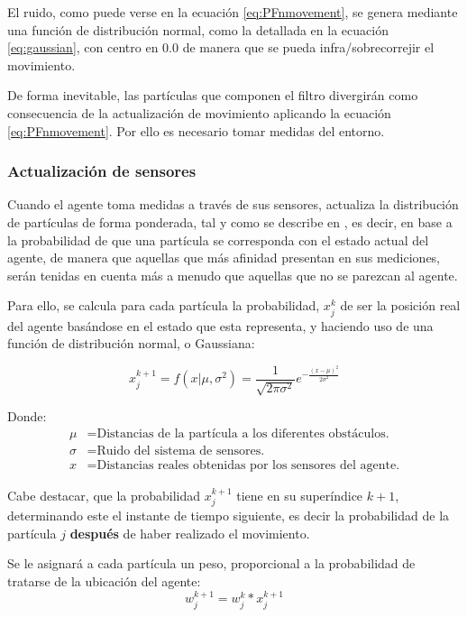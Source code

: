 \noindent El ruido, como puede verse en la ecuación \ref{eq:PFnmovement}, se genera mediante una función de distribución normal, como la detallada en la ecuación \ref{eq:gaussian}, con centro en $0.0$ de manera que se pueda infra/sobrecorrejir el movimiento.


De forma inevitable, las partículas que componen el filtro divergirán como consecuencia de la actualización de movimiento aplicando la ecuación \ref{eq:PFnmovement}. Por ello es necesario tomar medidas del entorno.

\subsubsection{Actualización de sensores}
Cuando el agente toma medidas a través de sus sensores, actualiza la distribución de partículas de forma ponderada, tal y como se describe en \citep{art:PFTuto, art:PFBL}, es decir, en base a la probabilidad de que una partícula se corresponda con el estado actual del agente, de manera que aquellas que más afinidad presentan en sus mediciones, serán tenidas en cuenta más a menudo que aquellas que no se parezcan al agente.

Para ello, se calcula para cada partícula la probabilidad, $x_j^{k}$ de ser la posición real del agente basándose en el estado que esta representa, y haciendo uso de una función de distribución normal, o Gaussiana:

\begin{equation}
\label{eq:gaussian}
x_j^{k+1} = f(x|\mu, \sigma^2)=\frac{1}{\sqrt{2\pi \sigma^2}}e^{-\frac{(x-\mu)^2}{2\sigma^2}}
\end{equation}

Donde:
\begin{align*}
\mu &= \text{Distancias de la partícula a los diferentes obstáculos.}\\
\sigma &= \text{Ruido del sistema de sensores.}\\
x &= \text{Distancias reales obtenidas por los sensores del agente.}
\end{align*}

Cabe destacar, que la probabilidad $x_j^{k+1}$ tiene en su superíndice $k+1$, determinando este el instante de tiempo siguiente, es decir la probabilidad de la partícula $j$ \textbf{después} de haber realizado el movimiento.

Se le asignará a cada partícula un peso, proporcional a la probabilidad de tratarse de la ubicación del agente:
\begin{equation}
w_j^{k+1}=w_j^{k}*x_j^{k+1}
\end{equation}

